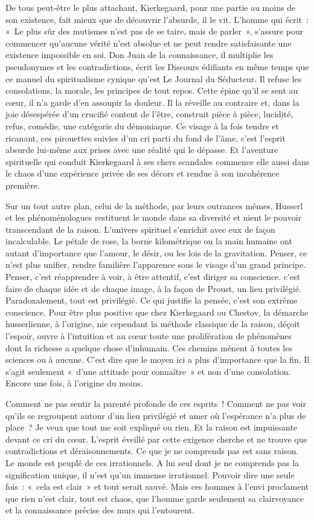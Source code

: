 \documentclass{book}
\begin{document}
De tous peut‑être le plus attachant, Kierkegaard, pour une partie au moins de son existence, fait mieux que de découvrir l'absurde, il le vit. L'homme qui écrit : « Le plus sûr des mutismes n'est pas de se taire, mais de parler », s'assure pour commencer qu'aucune vérité n'est absolue et ne peut rendre satisfaisante une existence impossible en soi. Don Juan de la connaissance, il multiplie les pseudonymes et les contradictions, écrit les Discours édifiants en même temps que ce manuel du spiritualisme cynique qu'est Le Journal du Séducteur. Il refuse les consolations, la morale, les principes de tout repos. Cette épine qu'il se sent au cœur, il n'a garde d'en assoupir la douleur. Il la réveille au contraire et, dans la joie désespérée d'un crucifié content de l'être, construit pièce à pièce, lucidité, refus, comédie, une catégorie du démoniaque. Ce visage à la fois tendre et ricanant, ces pirouettes suivies d'un cri parti du fond de l'âme, c'est l'esprit absurde lui-même aux prises avec une réalité qui le dépasse. Et l'aventure spirituelle qui conduit Kierkegaard à ses chers scandales commence elle aussi dans le chaos d'une expérience privée de ses décors et rendue à son incohérence première.

Sur un tout autre plan, celui de la méthode, par leurs outrances mêmes, Husserl et les phénoménologues restituent le monde dans sa diversité et nient le pouvoir transcendant de la raison. L'univers spirituel s'enrichit avec eux de façon incalculable. Le pétale de rose, la borne kilométrique ou la main humaine ont autant d'importance que l'amour, le désir, ou les lois de la gravitation. Penser, ce n'est plus unifier, rendre familière l'apparence sous le visage d'un grand principe. Penser, c'est réapprendre à voir, à être attentif, c'est diriger sa conscience. c'est faire de chaque idée et de chaque image, à la façon de Proust, un lieu privilégié. Paradoxalement, tout est privilégié. Ce qui justifie la pensée, c'est son extrême conscience. Pour être plus positive que chez Kierkegaard ou Chestov, la démarche husserlienne, à l'origine, nie cependant la méthode classique de la raison, déçoit l'espoir, ouvre à l'intuition et au cœur toute une prolifération de phénomènes dont la richesse a quelque chose d'inhumain. Ces chemins mènent à toutes les sciences ou à aucune. C'est dire que le moyen ici a plus d'importance que la fin. Il s'agit seulement « d'une attitude pour connaître » et non d'une consolation. Encore une fois, à l'origine du moins.

Comment ne pas sentir la parenté profonde de ces esprits ! Comment ne pas voir qu'ils se regroupent autour d'un lieu privilégié et amer où l'espérance n'a plus de place ? Je veux que tout me soit expliqué ou rien. Et la raison est impuissante devant ce cri du cœur. L'esprit éveillé par cette exigence cherche et ne trouve que contradictions et déraisonnements. Ce que je ne comprends pas est sans raison. Le monde est peuplé de ces irrationnels. A lui seul dont je ne comprends pas la signification unique, il n'est qu'un immense irrationnel. Pouvoir dire une seule fois : « cela est clair » et tout serait sauvé. Mais ces hommes à l'envi proclament que rien n'est clair, tout est chaos, que l'homme garde seulement sa clairvoyance et la connaissance précise des murs qui l'entourent.
\end{document}
